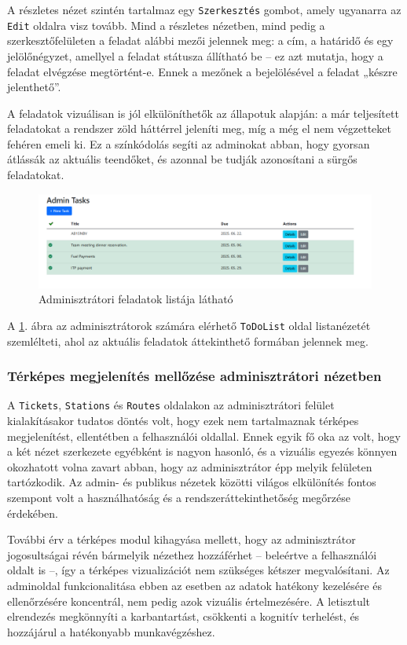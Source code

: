 A részletes nézet szintén tartalmaz egy \texttt{Szerkesztés} gombot, amely ugyanarra az \texttt{Edit} oldalra visz tovább. Mind a részletes nézetben, mind pedig a szerkesztőfelületen a feladat alábbi mezői jelennek meg: a cím, a határidő és egy jelölőnégyzet, amellyel a feladat státusza állítható be – ez azt mutatja, hogy a feladat elvégzése megtörtént-e. Ennek a mezőnek a bejelölésével a feladat „készre jelenthető”.

A feladatok vizuálisan is jól elkülöníthetők az állapotuk alapján: a már teljesített feladatokat a rendszer zöld háttérrel jeleníti meg, míg a még el nem végzetteket fehéren emeli ki. Ez a színkódolás segíti az adminokat abban, hogy gyorsan átlássák az aktuális teendőket, és azonnal be tudják azonosítani a sürgős feladatokat.


\begin{figure}[H]
\centering
\includegraphics[width=1\textwidth]{Szakdolgozat/Mellekletek/admintasks.PNG}
\caption{Adminisztrátori feladatok listája látható }
\label{fig:todo-admintask}
\end{figure}

A \ref{fig:todo-admintask}. ábra az adminisztrátorok számára elérhető \texttt{ToDoList} oldal listanézetét szemlélteti, ahol az aktuális feladatok áttekinthető formában jelennek meg.

\subsubsection{Térképes megjelenítés mellőzése adminisztrátori nézetben}

\indent A \texttt{Tickets}, \texttt{Stations} és \texttt{Routes} oldalakon az adminisztrátori felület kialakításakor tudatos döntés volt, hogy ezek nem tartalmaznak térképes megjelenítést, ellentétben a felhasználói oldallal. Ennek egyik fő oka az volt, hogy a két nézet szerkezete egyébként is nagyon hasonló, és a vizuális egyezés könnyen okozhatott volna zavart abban, hogy az adminisztrátor épp melyik felületen tartózkodik. Az admin- és publikus nézetek közötti világos elkülönítés fontos szempont volt a használhatóság és a rendszeráttekinthetőség megőrzése érdekében.

\indent További érv a térképes modul kihagyása mellett, hogy az adminisztrátor jogosultságai révén bármelyik nézethez hozzáférhet – beleértve a felhasználói oldalt is –, így a térképes vizualizációt nem szükséges kétszer megvalósítani. Az adminoldal funkcionalitása ebben az esetben az adatok hatékony kezelésére és ellenőrzésére koncentrál, nem pedig azok vizuális értelmezésére. A letisztult elrendezés megkönnyíti a karbantartást, csökkenti a kognitív terhelést, és hozzájárul a hatékonyabb munkavégzéshez.
